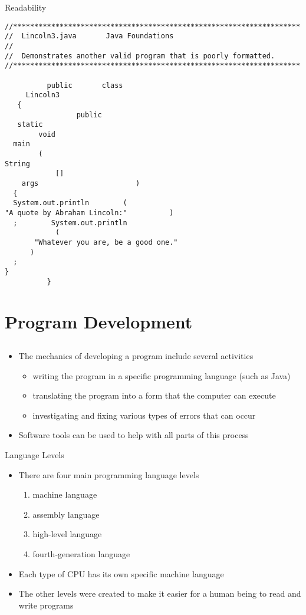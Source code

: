 \documentclass{beamer}
\begin{document}
\begin{frame}[fragile]{Readability}
\begin{lstlisting}
//********************************************************************
//  Lincoln3.java       Java Foundations
//
//  Demonstrates another valid program that is poorly formatted.
//********************************************************************

          public       class
     Lincoln3
   {
                 public
   static
        void
  main
        (
String
            []
    args                       ) 
  {
  System.out.println        (
"A quote by Abraham Lincoln:"          )
  ;        System.out.println
            (
       "Whatever you are, be a good one."
      )
  ;
}
          }
\end{lstlisting}
\end{frame}

\section{Program Development}
\subsection{}
\begin{frame}{}
\begin{itemize}
\item The mechanics of developing a program include several activities
\begin{itemize}
\item writing the program in a specific programming language (such as Java)
\item translating the program into a form that the computer can execute
\item investigating and fixing various types of errors that can occur
\end{itemize}
\item Software tools can be used to help with all parts of this process
\end{itemize}
\end{frame}

\begin{frame}{Language Levels}
\begin{itemize}
\item There are four main programming language levels
\begin{enumerate}
\item machine language
\item assembly language
\item high-level language
\item fourth-generation language
\end{enumerate}
\item Each type of CPU has its own specific machine language
\item The other levels were created to make it easier for a human being to read and write programs
\end{itemize}
\end{frame}
\end{document}

